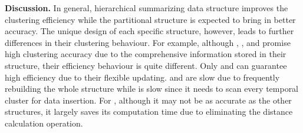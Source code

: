 
\textbf{Discussion.}
\label{subsec:data_structure_discussion}
In general, hierarchical summarizing data structure improves the clustering efficiency while the partitional structure is expected to bring in better accuracy. 
The unique design of each specific structure, however, leads to further differences in their clustering behaviour.
For example, although \CFT, \CoreT, \DPT and \MCs promise high clustering accuracy due to the comprehensive information stored in their structure, their efficiency behaviour is quite different. Only \CFT and \DPT can guarantee high efficiency due to their flexible updating. \CoreT and \MS are slow due to frequently rebuilding the whole structure while \MCs is slow since it needs to scan every temporal cluster for data insertion. For \Grids, although it may not be as accurate as the other structures, it largely saves its computation time due to eliminating the distance calculation operation. 

